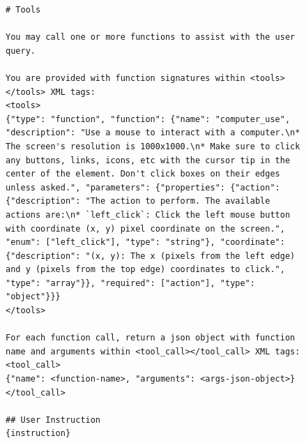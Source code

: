 \begin{figure}[t]
\begin{tcolorbox}[colback=white, width=\linewidth, breakable, enhanced, 
                  title=Prompt for the GUI-Owl-1.5 Model, fonttitle=\bfseries]

\lstset{
basicstyle=\scriptsize\ttfamily,
    columns=fullflexible,
    breaklines=true,
    breakatwhitespace=false,
    showstringspaces=false,
    lineskip=-1pt
}

\begin{lstlisting}
# Tools

You may call one or more functions to assist with the user query.

You are provided with function signatures within <tools></tools> XML tags:
<tools>
{"type": "function", "function": {"name": "computer_use", "description": "Use a mouse to interact with a computer.\n* The screen's resolution is 1000x1000.\n* Make sure to click any buttons, links, icons, etc with the cursor tip in the center of the element. Don't click boxes on their edges unless asked.", "parameters": {"properties": {"action": {"description": "The action to perform. The available actions are:\n* `left_click`: Click the left mouse button with coordinate (x, y) pixel coordinate on the screen.", "enum": ["left_click"], "type": "string"}, "coordinate": {"description": "(x, y): The x (pixels from the left edge) and y (pixels from the top edge) coordinates to click.", "type": "array"}}, "required": ["action"], "type": "object"}}}
</tools>

For each function call, return a json object with function name and arguments within <tool_call></tool_call> XML tags:
<tool_call>
{"name": <function-name>, "arguments": <args-json-object>}
</tool_call>

## User Instruction
{instruction}

\end{lstlisting}

\end{tcolorbox}
\end{figure}
